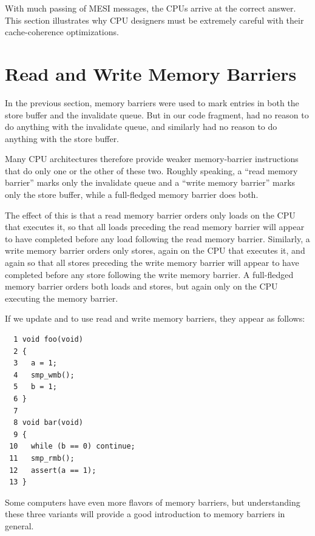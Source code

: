 With much passing of MESI messages, the CPUs arrive at the correct answer.
This section illustrates why CPU designers must be extremely careful
with their cache-coherence optimizations.

\section{Read and Write Memory Barriers}
\label{sec:app:whymb:Read and Write Memory Barriers}

In the previous section, memory barriers were used to mark entries in
both the store buffer and the invalidate queue.
But in our code fragment,  had no reason to do anything
with the invalidate queue, and  similarly had no reason
to do anything with the store buffer.

Many CPU architectures therefore provide weaker memory-barrier
instructions that do only one or the other of these two.
Roughly speaking, a ``read memory barrier'' marks only the invalidate
queue and a ``write memory barrier'' marks only the store buffer,
while a full-fledged memory barrier does both.

The effect of this is that a read memory barrier orders only loads
on the CPU that executes it, so that all loads preceding the read memory
barrier will appear to have completed before any load following the
read memory barrier.
Similarly, a write memory barrier orders
only stores, again on the CPU that executes it, and again so that
all stores preceding the write memory barrier will appear to have
completed before any store following the write memory barrier.
A full-fledged memory barrier orders both loads and stores, but again
only on the CPU executing the memory barrier.

If we update  and  to use read and write memory
barriers, they appear as follows:

\vspace{5pt}
\begin{minipage}[t]{\columnwidth}
\small
\begin{verbatim}
  1 void foo(void)
  2 {
  3   a = 1;
  4   smp_wmb();
  5   b = 1;
  6 }
  7
  8 void bar(void)
  9 {
 10   while (b == 0) continue;
 11   smp_rmb();
 12   assert(a == 1);
 13 }
\end{verbatim}
\end{minipage}
\vspace{5pt}

Some computers have even more flavors of memory barriers, but
understanding these three variants will provide a good introduction
to memory barriers in general.

